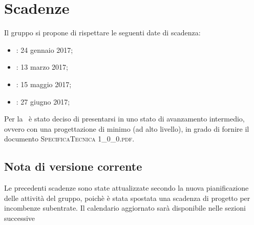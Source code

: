 \newpage
\section{Scadenze}
Il gruppo \textit{\gruppo} si propone di rispettare le seguenti date di scadenza:
\begin{itemize}
	\item \textbf{\RR}: 24 gennaio 2017;
	\item \textbf{\RP}: 13 marzo 2017;
	\item \textbf{\RQ}: 15 maggio 2017;
	\item \textbf{\RA}: 27 giugno 2017;
\end{itemize}
Per la \RP\ è stato deciso di presentarsi in uno stato di avanzamento intermedio, ovvero con una progettazione di minimo (ad alto livello), in grado di fornire il documento \textsc{SpecificaTecnica 1\_0\_0.pdf}.

\subsection{Nota di versione corrente}
Le precedenti scadenze sono state attualizzate secondo la nuova pianificazione delle attività del gruppo, poichè è stata spostata una scadenza di progetto per incombenze subentrate. Il calendario aggiornato sarà disponibile nelle sezioni successive